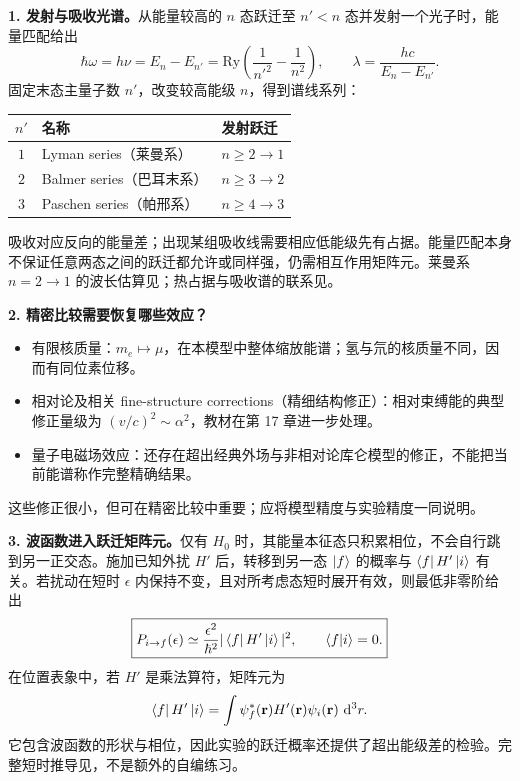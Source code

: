 \textbf{1. 发射与吸收光谱。}从能量较高的 $n$ 态跃迁至 $n'<n$ 态并发射一个光子时，能量匹配给出
\begin{equation}
  \boxed{\hbar\omega=h\nu=E_n-E_{n'}
     =\mathrm{Ry}\left(\frac1{n'^2}-\frac1{n^2}\right),\qquad
     \lambda=\frac{hc}{E_n-E_{n'}}.}
\end{equation}
固定末态主量子数 $n'$，改变较高能级 $n$，得到谱线系列：
\begin{center}
\begin{tabular}{@{}cll@{}}
  \toprule
  $n'$ & 名称 & 发射跃迁 \\
  \midrule
  $1$ & Lyman series（莱曼系） & $n\ge2\to1$ \\
  $2$ & Balmer series（巴耳末系） & $n\ge3\to2$ \\
  $3$ & Paschen series（帕邢系） & $n\ge4\to3$ \\
  \bottomrule
\end{tabular}
\end{center}
吸收对应反向的能量差；出现某组吸收线需要相应低能级先有占据。能量匹配本身不保证任意两态之间的跃迁都允许或同样强，仍需相互作用矩阵元。莱曼系 $n=2\to1$ 的波长估算见；热占据与吸收谱的联系见。

\textbf{2. 精密比较需要恢复哪些效应？}
\begin{itemize}
  \item 有限核质量：$m_e\mapsto\mu$，在本模型中整体缩放能谱；氢与氘的核质量不同，因而有同位素位移。
  \item 相对论及相关 fine-structure corrections（精细结构修正）：相对束缚能的典型修正量级为 $(v/c)^2\sim\alpha^2$，教材在第 17 章进一步处理。
  \item 量子电磁场效应：还存在超出经典外场与非相对论库仑模型的修正，不能把当前能谱称作完整精确结果。
\end{itemize}
这些修正很小，但可在精密比较中重要；应将模型精度与实验精度一同说明。

\textbf{3. 波函数进入跃迁矩阵元。}仅有 $H_0$ 时，其能量本征态只积累相位，不会自行跳到另一正交态。施加已知外扰 $H'$ 后，转移到另一态 $\left|f\right\rangle$ 的概率与 $\left\langle f\right|H'\left|i\right\rangle$ 有关。若扰动在短时 $\epsilon$ 内保持不变，且对所考虑态短时展开有效，则最低非零阶给出
\begin{equation}
  \boxed{P_{i\to f}(\epsilon)
     \simeq\frac{\epsilon^2}{\hbar^2}|\left\langle f\right|H'\left|i\right\rangle|^2,
     \qquad \left\langle f \middle| i \right\rangle=0.}
\end{equation}
在位置表象中，若 $H'$ 是乘法算符，矩阵元为
\begin{equation}
  \left\langle f\right|H'\left|i\right\rangle
    =\int\psi_f^*(\mathbf r)H'(\mathbf r)\psi_i(\mathbf r)\,\mathop{}\!\mathrm{d}^3r.
\end{equation}
它包含波函数的形状与相位，因此实验的跃迁概率还提供了超出能级差的检验。完整短时推导见，不是额外的自编练习。

